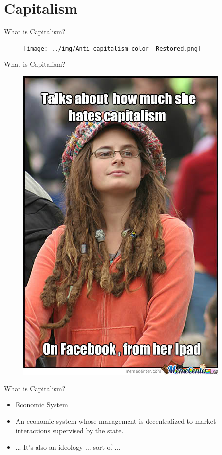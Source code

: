 \documentclass{beamer}
\begin{document}
\section{Capitalism}

\begin{frame}{What is Capitalism?}
\begin{figure}
    \texttt{[image: ../img/Anti-capitalism\_color—\_Restored.png]}
\end{figure}
\end{frame}{}

\begin{frame}{What is Capitalism?}
\begin{figure}
    \includegraphics[height=0.8\textheight]{../img/i-like-titles_o_831947.jpg}
\end{figure}
\end{frame}{}

\begin{frame}{What is Capitalism?}
\begin{itemize}[<+- | alert@+>]
    \item Economic System
    \item An economic system whose management is decentralized to market interactions supervised by the state.  \item ... It's also an ideology ... sort of ...
\end{itemize}{}
\end{frame}{}
\end{document}
